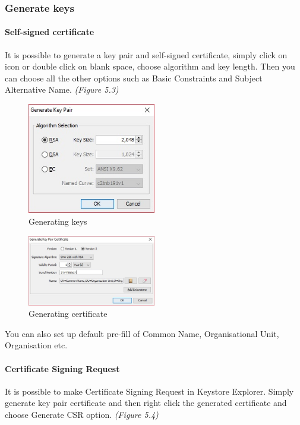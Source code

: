 \documentclass[10pt, a4paper]{report}
\begin{document}
    \subsubsection{Generate keys}
    
      \paragraph{Self-signed certificate}
It is possible to generate a key pair and self-signed certificate, simply click on icon or double click on blank space, choose algorithm and key length. Then you can choose all the other options such as Basic Constraints and Subject Alternative Name. \textit{(Figure 5.3)}

\begin{figure}[!ht]
 \caption{Generating keys}
 \centering
  \includegraphics[width=0.5\textwidth]{../Dependancies/Keystore_Explorer/genKeys.jpg}
\end{figure}

\begin{figure}[!ht]
 \caption{Generating certificate}
 \centering
  \includegraphics[width=0.5\textwidth]{../Dependancies/Keystore_Explorer/genCert.jpg}
\end{figure}

You can also set up default pre-fill of Common Name, Organisational Unit, Organisation etc.

      \paragraph{Certificate Signing Request}
It is possible to make Certificate Signing Request in Keystore Explorer. Simply generate key pair certificate and then right click the generated certificate and choose Generate CSR option. \textit{(Figure 5.4)}
\end{document}
